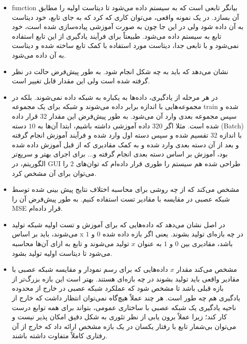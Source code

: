 \documentclass[12pt,titlepage,a4page , tikz , multi,table , svgnames,xcdraw]{article}
\begin{document}
\begin{itemize}

\item
function بیانگر تابعی است که به سیستم داده می‌شود تا دیتاست اولیه را مطابق آن بسازد. در یک نمونه واقعی، می‌توان کاری که کرد که به جای تابع، خود دیتاست به آن داده شود ولی در این جا چون به صورت آموزشی پیاده‌سازی شده است، خود تابع به سیستم داده می‌شود. طبیعتاً برای فرآیند یادگیری از این تابع استفاده نمی‌شود و با تابعی جدا، دیتاست مورد استفاده با کمک تابع ساخته شده و دیتاست به آن داده می‌شود.

\item
{} نشان می‌دهد که  باید به چه شکل انجام شود. به طور پیش‌فرض حالت  در نظر گرفته شده است ولی این مقدار قابل تغییر است.

\item
{}
در هر مرحله از یادگیری، داده‌ها به یکباره به شبکه داده نمی‌شوند. بلکه در مجموعه‌هایی با اندازه برابر داده می‌شوند و شبکه برای یک مجموعه train شده و سپس مجموعه بعدی وارد آن می‌شود. به طور پیش‌فرض این مقدار $32$ قرار داده شده است. مثلا اگر $320$ داده آموزشی داشته باشیم، ابتدا آن‌ها به $10$ دسته (Batch) با اندازه $32$ تقسیم شده و سپس دسته اول وارد شده و فرآیند آموزش انجام گرفته و بعد از آن دسته بعدی وارد شده و به کمک مقادیری که از قبل آموزش داده شده بود، آموزش بر اساس دسته بعدی انجام گرفته و... برای اجرای بهتر و سریع‌تر الگوریتم، در GUI طراحی شده هم سیستم را طوری قرار داده‌ام که توان‌های $2$ را می‌توان برای آن مشخص کرد. 

\item
{}
مشخص می‌کند که از چه روشی برای محاسبه اختلاف نتایج پیش بینی شده توسط شبکه عصبی در مقایسه با مقادیر تست استفاده کنیم. به طور پیش‌فرض آن را MSE قرار داده‌ام.

\item
{}
در اصل نشان می‌دهد که داده‌هایی که برای آموزش و تست اولیه شبکه تولید می‌شوند، باید بر اساس x در چه بازه‌ای تولید بشوند. یعنی اگر بازه داده شده $0$ و $1$ باشد، مقادیری بین $0$ و $1$ به عنوان $x$ تولید می‌شوند و تابع به ازای آن‌ها محاسبه می‌شود تا دیتاست اولیه تولید بشود.


\item
{}
مشخص می‌کند مقدار $x$ داده‌هایی که برای رسم نمودار و مقایسه شبکه عصبی با مقادیر واقعی باید تولید بشوند در چه بازه‌ای هستند. بهتر است این بازه بزرگ‌تر از بازه قبلی باشد تا مشخص شود که عملکرد شبکه عصبی در خارج از محدوده یادگیری هم چه طور است. هر چند عملاً هیچ‌گاه نمی‌توان انتظار داشت که خارج از ناحیه یادگیری یک شبکه عصبی با ساختاری عمومی، بتواند برای همه توابع درست کار کند؛ زیرا عملاً برون یابی از نظر تئوری به شکل دقیق امکان پذیر نیست و می‌توان بی‌شمار تابع با رفتار یکسان در یک بازه مشخص ارائه داد که خارج از آن رفتاری کاملاً متفاوت داشته باشند.



\end{itemize}
\end{document}
